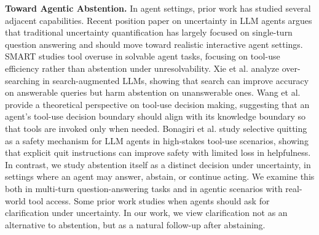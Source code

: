 \documentclass{article}
\begin{document}
\textbf{Toward Agentic Abstention.} In agent settings, prior work has studied several adjacent capabilities. Recent position paper \cite{kirchhof2025position, oh2026uncertainty} on uncertainty in LLM agents argues that traditional uncertainty quantification has largely focused on single-turn question answering and should move toward realistic interactive agent settings. SMART \cite{qian2025smart} studies tool overuse in solvable agent tasks, focusing on tool-use efficiency rather than abstention under unresolvability. Xie et al. \cite{xie2026oversearchingsearchaugmentedlargelanguage} analyze over-searching in search-augmented LLMs, showing that search can improve accuracy on answerable queries but harm abstention on unanswerable ones. Wang et al. \cite{wang2025toward} provide a theoretical perspective on tool-use decision making, suggesting that an agent’s tool-use decision boundary should align with its knowledge boundary so that tools are invoked only when needed. Bonagiri et al. \cite{bonagiri2025check} study selective quitting as a safety mechanism for LLM agents in high-stakes tool-use scenarios, showing that explicit quit instructions can improve safety with limited loss in helpfulness. In contrast, we study abstention itself as a distinct decision under uncertainty, in settings where an agent may answer, abstain, or continue acting. We examine this both in multi-turn question-answering tasks and in agentic scenarios with real-world tool access. Some prior work \cite{zhang2025clarify, zhang2024clamber, kobalczyk2025active} studies when agents should ask for clarification under uncertainty. In our work, we view clarification not as an alternative to abstention, but as a natural follow-up after abstaining.
\end{document}

